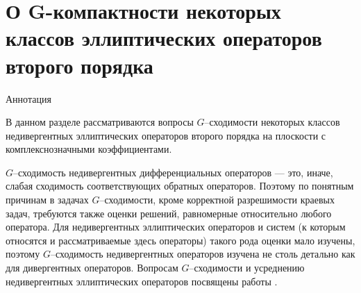 

\chapter{О G-компактности некоторых классов эллиптических операторов второго порядка}

Аннотация

В данном разделе 
рассматриваются вопросы $G$--сходимости некоторых классов недивергентных
эллиптических операторов
второго порядка на плоскости с комплекснозначными коэффициентами.



$G$--сходимость недивергентных дифференциальных операторов --- это, иначе, слабая сходимость
соответствующих обратных операторов. Поэтому по понятным причинам в задачах
$G$--сходимости,
кроме корректной разрешимости краевых задач, требуются также оценки решений,
равномерные относительно любого оператора. Для недивергентных эллиптических
операторов и систем (к которым относятся и рассматриваемые здесь операторы)
такого рода оценки мало изучены, поэтому $G$--сходимость
недивергентных операторов изучена не столь детально как для дивергентных операторов.
Вопросам $G$--сходимости и усреднению недивергентных эллиптических операторов
посвящены работы \cite{smm_ZhS, smm_ZhS1, smm_Sir1,smm_Sir}.

